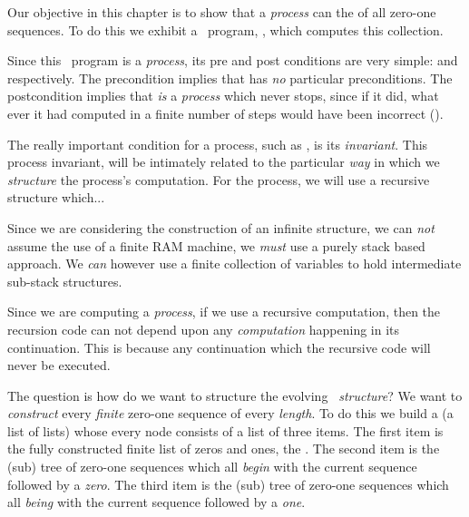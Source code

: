 \stopMPcode\egroup

Our objective in this chapter is to show that a \emph{process} can 
 the  of all zero-one sequences. To do 
this we exhibit a \joylol\ program, , which computes this 
collection. 

Since this \joylol\ program is a \emph{process}, its pre and post 
conditions are very simple:  and  respectively. The 
 precondition implies that  has \emph{no} 
particular preconditions. The  postcondition implies that 
 \emph{is} a \emph{process} which never stops, since if it 
did, what ever it had computed in a finite number of steps would have been 
incorrect (). 

The really important condition for a process, such as , is 
its \emph{invariant}. This process invariant, will be intimately related 
to the particular \emph{way} in which we \emph{structure} the process's 
computation. For the  process, we will use a recursive 
structure which... 

Since we are considering the construction of an infinite structure, we can 
\emph{not} assume the use of a finite RAM machine, we \emph{must} use a 
purely stack based approach. We \emph{can} however use a finite collection 
of  variables to hold intermediate sub-stack structures. 

Since we are computing a \emph{process}, if we use a recursive 
computation, then the recursion code can not depend upon any 
\emph{computation} happening in its continuation. This is because any 
continuation which the recursive code  will never be executed. 

The question is how do we want to structure the evolving \emph{\joylol\ 
structure}? We want to \emph{construct} every \emph{finite} zero-one 
sequence of every \emph{length}. To do this we build a \quote{tree} (a 
list of lists) whose every node consists of a list of three items. The 
first item is the fully constructed finite list of zeros and ones, the 
\quote{current sequence}. The second item is the (sub) tree of zero-one 
sequences which all \emph{begin} with the current sequence followed by a 
\emph{zero}. The third item is the (sub) tree of zero-one sequences which 
all \emph{being} with the current sequence followed by a \emph{one}. 

